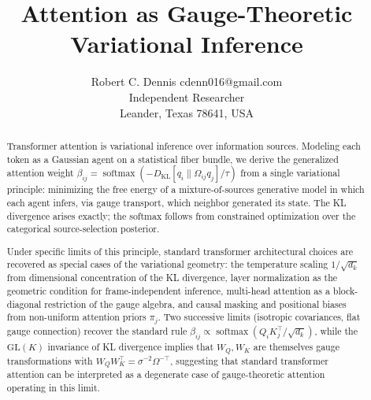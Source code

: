 \documentclass[twoside,11pt]{article}
\begin{document}

\title{Attention as Gauge-Theoretic Variational Inference}

\author{\name Robert C. Dennis \email cdenn016@gmail.com \\
  \addr Independent Researcher\\
  \addr Leander, Texas 78641, USA}


\maketitle

\begin{abstract}
Transformer attention is variational inference over information sources. Modeling each token as a Gaussian agent on a statistical fiber bundle, we derive the generalized attention weight $\beta_{ij} = \operatorname{softmax}(-D_{\mathrm{KL}}[q_i \| \Omega_{ij} q_j] / \tau)$ from a single variational principle: minimizing the free energy of a mixture-of-sources generative model in which each agent infers, via gauge transport, which neighbor generated its state. The KL divergence arises exactly; the softmax follows from constrained optimization over the categorical source-selection posterior.

Under specific limits of this principle, standard transformer architectural choices are recovered as special cases of the variational geometry: the temperature scaling $1/\sqrt{d_k}$ from dimensional concentration of the KL divergence, layer normalization as the geometric condition for frame-independent inference, multi-head attention as a block-diagonal restriction of the gauge algebra, and causal masking and positional biases from non-uniform attention priors $\pi_j$. Two successive limits (isotropic covariances, flat gauge connection) recover the standard rule $\beta_{ij} \propto \operatorname{softmax}(Q_i K_j^\top / \sqrt{d_k})$, while the $\mathrm{GL}(K)$ invariance of KL divergence implies that $W_Q, W_K$ are themselves gauge transformations with $W_Q W_K^\top = \sigma^{-2}\Omega^{-\top}$, suggesting that standard transformer attention can be interpreted as a degenerate case of gauge-theoretic attention operating in this limit.


\end{abstract}
\end{document}
